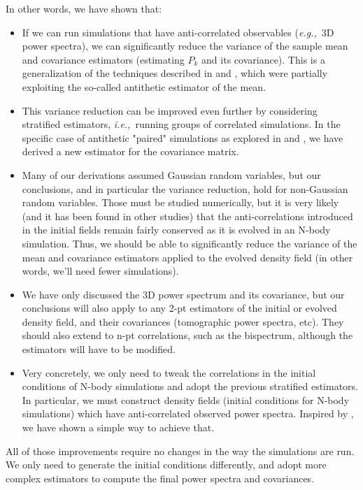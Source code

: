 \documentclass{aastex6}
\newcommand{\ie}{{\textit{i.e.,}~}}
\newcommand{\eg}{{\textit{e.g.,}~}}
\begin{document}
In other words, we have shown that:
\begin{itemize}
	\item If we can run simulations that have anti-correlated observables (\eg 3D power spectra), we can significantly reduce the variance of the sample mean and covariance estimators (estimating $P_k$ and its covariance). This is a generalization of the techniques described in \cite{PontzenEtAl2016} and \cite{AnguloPontzen2016}, which were partially exploiting the so-called antithetic estimator of the mean.
	\item This variance reduction can be improved even further by considering stratified estimators, \ie running groups of correlated simulations. In the specific case of antithetic "paired" simulations as explored in \cite{PontzenEtAl2016} and \cite{AnguloPontzen2016}, we have derived a new estimator for the covariance matrix.
	\item Many of our derivations assumed Gaussian random variables, but our conclusions, and in particular the variance reduction, hold for non-Gaussian random variables. Those must be studied numerically, but it is very likely (and it has been found in other studies) that the anti-correlations introduced in the initial fields remain fairly conserved as it is evolved in an N-body simulation.
	Thus, we should be able to significantly reduce the variance of the mean and covariance estimators applied to the evolved density field (in other words, we'll need fewer simulations).
	\item We have only discussed the 3D power spectrum and its covariance, but our conclusions will also apply to any 2-pt estimators of the initial or evolved density field, and their covariances (tomographic power spectra, etc). They should also extend to n-pt correlations, such as the bispectrum, although the estimators will have to be modified.
	\item Very concretely, we only need to tweak the correlations in the initial conditions of N-body simulations and adopt the previous stratified estimators. In particular, we must construct density fields (initial conditions for N-body simulations) which have anti-correlated observed power spectra. Inspired by \cite{AnguloPontzen2016}, we have shown a simple way to achieve that. 
\end{itemize}

All of those improvements require no changes in the way the simulations are run. We only need to generate the initial conditions differently, and adopt more complex estimators to compute the final power spectra and covariances.
\end{document}
